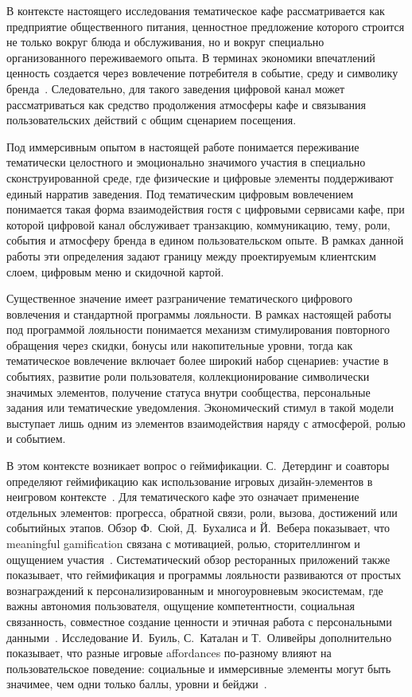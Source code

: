 В контексте настоящего исследования тематическое кафе рассматривается как предприятие общественного питания, ценностное предложение которого строится не только вокруг блюда и обслуживания, но и вокруг специально организованного переживаемого опыта. В терминах экономики впечатлений ценность создается через вовлечение потребителя в событие, среду и символику бренда~\cite{pine1998}. Следовательно, для такого заведения цифровой канал может рассматриваться как средство продолжения атмосферы кафе и связывания пользовательских действий с общим сценарием посещения.

Под иммерсивным опытом в настоящей работе понимается переживание тематически целостного и эмоционально значимого участия в специально сконструированной среде, где физические и цифровые элементы поддерживают единый нарратив заведения. Под тематическим цифровым вовлечением понимается такая форма взаимодействия гостя с цифровыми сервисами кафе, при которой цифровой канал обслуживает транзакцию, коммуникацию, тему, роли, события и атмосферу бренда в едином пользовательском опыте. В рамках данной работы эти определения задают границу между проектируемым клиентским слоем, цифровым меню и скидочной картой.

Существенное значение имеет разграничение тематического цифрового вовлечения и стандартной программы лояльности. В рамках настоящей работы под программой лояльности понимается механизм стимулирования повторного обращения через скидки, бонусы или накопительные уровни, тогда как тематическое вовлечение включает более широкий набор сценариев: участие в событиях, развитие роли пользователя, коллекционирование символически значимых элементов, получение статуса внутри сообщества, персональные задания или тематические уведомления. Экономический стимул в такой модели выступает лишь одним из элементов взаимодействия наряду с атмосферой, ролью и событием.

В этом контексте возникает вопрос о геймификации. С.~Детердинг и соавторы определяют геймификацию как использование игровых дизайн-элементов в неигровом контексте~\cite{deterding2011}. Для тематического кафе это означает применение отдельных элементов: прогресса, обратной связи, роли, вызова, достижений или событийных этапов. Обзор Ф.~Сюй, Д.~Бухалиса и Й.~Вебера показывает, что meaningful gamification связана с мотивацией, ролью, сторителлингом и ощущением участия~\cite{xu2017}. Систематический обзор ресторанных приложений также показывает, что геймификация и программы лояльности развиваются от простых вознаграждений к персонализированным и многоуровневым экосистемам, где важны автономия пользователя, ощущение компетентности, социальная связанность, совместное создание ценности и этичная работа с персональными данными~\cite{sutrisno2026}. Исследование И.~Буиль, С.~Каталан и Т.~Оливейры дополнительно показывает, что разные игровые affordances по-разному влияют на пользовательское поведение: социальные и иммерсивные элементы могут быть значимее, чем одни только баллы, уровни и бейджи~\cite{buil2024}.

